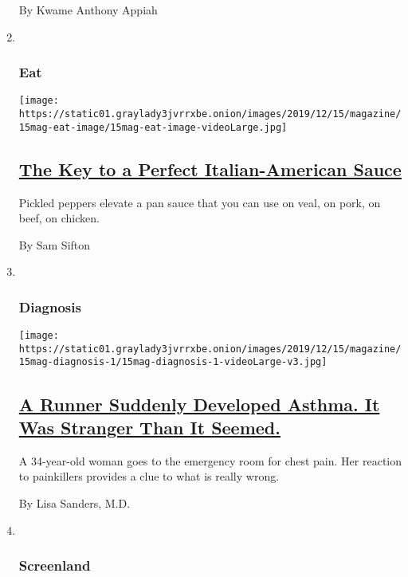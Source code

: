 \begin{enumerate}
  By Kwame Anthony Appiah
\item ~
  \hypertarget{eat}{%
  \subsubsection{Eat}\label{eat}}

  \texttt{[image: https://static01.graylady3jvrrxbe.onion/images/2019/12/15/magazine/15mag-eat-image/15mag-eat-image-videoLarge.jpg]}

  \hypertarget{the-key-to-a-perfect-italian-american-sauce}{%
  \subsection{\texorpdfstring{\href{/2019/12/11/magazine/cherry-pepper-italian-american-sauce-recipe.html}{The
  Key to a Perfect Italian-American
  Sauce}}{The Key to a Perfect Italian-American Sauce}}\label{the-key-to-a-perfect-italian-american-sauce}}

  Pickled peppers elevate a pan sauce that you can use on veal, on pork,
  on beef, on chicken.

  By Sam Sifton
\item ~
  \hypertarget{diagnosis}{%
  \subsubsection{Diagnosis}\label{diagnosis}}

  \texttt{[image: https://static01.graylady3jvrrxbe.onion/images/2019/12/15/magazine/15mag-diagnosis-1/15mag-diagnosis-1-videoLarge-v3.jpg]}

  \hypertarget{a-runner-suddenly-developed-asthma-it-was-stranger-than-it-seemed}{%
  \subsection{\texorpdfstring{\href{/2019/12/12/magazine/aspirin-exacerbated-respiratory-disease-aerd.html}{A
  Runner Suddenly Developed Asthma. It Was Stranger Than It
  Seemed.}}{A Runner Suddenly Developed Asthma. It Was Stranger Than It Seemed.}}\label{a-runner-suddenly-developed-asthma-it-was-stranger-than-it-seemed}}

  A 34-year-old woman goes to the emergency room for chest pain. Her
  reaction to painkillers provides a clue to what is really wrong.

  By Lisa Sanders, M.D.
\item ~
  \hypertarget{screenland}{%
  \subsubsection{Screenland}\label{screenland}}


\end{enumerate}
